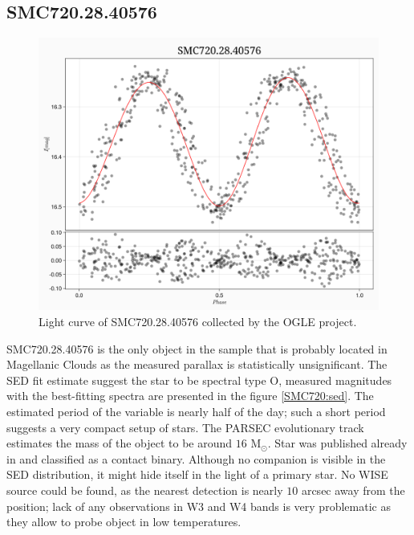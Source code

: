 \documentclass{pracalicmgr}
\begin{document}
\subsection{SMC720.28.40576}
\begin{figure}[H]
      \centering
      \includegraphics[scale=0.35]{plots/SMC720.28.40576_phase.png}
      \caption{Light curve of SMC720.28.40576 collected by the OGLE project.}
      \label{SMC720:lc}
\end{figure}
SMC720.28.40576 is the only object in the sample that is probably located in Magellanic Clouds as the measured parallax is statistically unsignificant.
The SED fit estimate suggest the star to be spectral type O, measured magnitudes with the best-fitting spectra are presented in the figure \ref{SMC720:sed}.
The estimated period of the variable is nearly half of the day; such a short period suggests a very compact setup of stars.
The PARSEC evolutionary track estimates the mass of the object to be around $16$  $\textrm{M}_{\odot}$.
Star was published already in \citet{pawlak_ogle_2016} and classified as a contact binary. Although
no companion is visible in the SED distribution, it might hide itself in the light of a primary star.
No WISE source could be found, as the nearest detection is nearly $10$ arcsec away from the position; lack of any observations
in W3 and W4 bands is very problematic as they allow to probe object in low temperatures.
\end{document}
